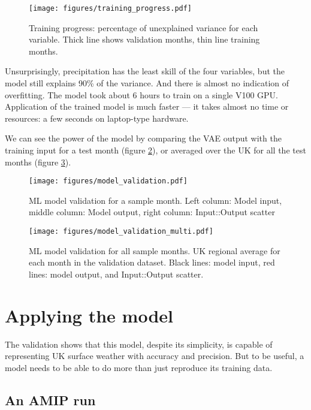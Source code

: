 \documentclass[gmd]{copernicus}
\begin{document}
\begin{figure}[h]
\texttt{[image: figures/training\_progress.pdf]}
\caption{Training progress: percentage of unexplained variance for each variable. Thick line shows validation months, thin line training months.}
\label{training_progress}
\end{figure}
    
Unsurprisingly, precipitation has the least skill of the four variables, but the model still explains 90\% of the variance. And there is almost no indication of overfitting. The model took about 6 hours to train on a single V100 GPU. Application of the trained model is much faster --- it takes almost no time or resources: a few seconds on laptop-type hardware.

We can see the power of the model by comparing the VAE output with the training input for a test month (figure \ref{model_validation}), or averaged over the UK for all the test months (figure \ref{model_validation_multi}).

\begin{figure}[h]
\texttt{[image: figures/model\_validation.pdf]}
\caption{ML model validation for a sample month. Left column: Model input, middle column: Model output, right column: Input::Output scatter}
\label{model_validation}
\end{figure}


\begin{figure}[h]
\texttt{[image: figures/model\_validation\_multi.pdf]}
\caption{ML model validation for all sample months. UK regional average for each month in the validation dataset. Black lines: model input, red lines: model output, and Input::Output scatter.}
\label{model_validation_multi}
\end{figure}


\section{Applying the model}

The validation shows that this model, despite its simplicity, is capable of representing UK surface weather with accuracy and precision. But to be useful, a model needs to be able to do more than just reproduce its training data.


\subsection{An AMIP run}
\end{document}
